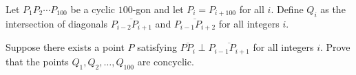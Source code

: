 Let $P_1P_2\dotsb P_{100}$ be a cyclic $100$-gon and let $P_i = P_{i+100}$ for all $i$. Define $Q_i$ as the intersection of diagonals $\overline{P_{i-2}P_{i+1}}$ and $\overline{P_{i-1}P_{i+2}}$ for all integers $i$.

Suppose there exists a point $P$ satisfying $\overline{PP_i}\perp\overline{P_{i-1}P_{i+1}}$ for all integers $i$. Prove that the points $Q_1,Q_2,\dots, Q_{100}$ are concyclic.
